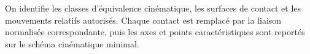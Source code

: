 \begin{corrigebox}[Corrigé]
On identifie les classes d'équivalence cinématique, les surfaces de contact et les mouvements relatifs autorisés. Chaque contact est remplacé par la liaison normalisée correspondante, puis les axes et points caractéristiques sont reportés sur le schéma cinématique minimal.
\end{corrigebox}

